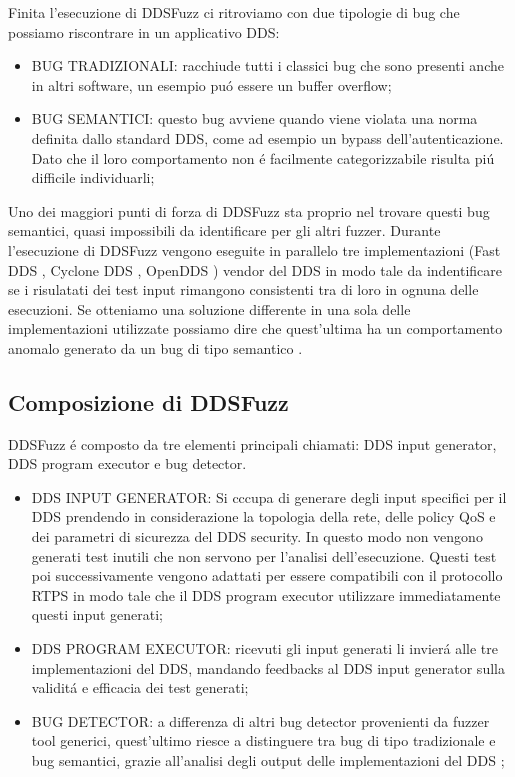 Finita l'esecuzione di DDSFuzz ci ritroviamo con due tipologie
di bug che possiamo riscontrare in un applicativo DDS:
\begin{itemize}
    \item BUG TRADIZIONALI: racchiude tutti i classici bug 
    che sono presenti anche in altri software, un esempio puó 
    essere un buffer overflow;
    \item BUG SEMANTICI: questo bug avviene quando viene violata
    una norma definita dallo standard DDS, come 
    ad esempio un bypass dell'autenticazione. 
    Dato che il loro comportamento
    non é facilmente categorizzabile risulta piú difficile individuarli;
\end{itemize}
Uno dei maggiori punti di forza di DDSFuzz sta proprio nel trovare
questi bug semantici, quasi impossibili da identificare per gli altri 
fuzzer. Durante l'esecuzione di DDSFuzz vengono eseguite in parallelo 
tre implementazioni (Fast DDS \cite{FastDDS}, Cyclone DDS \cite{CycloneDDS}, 
OpenDDS \cite{OpenDDS1}) vendor 
del DDS in modo tale da indentificare
se i risulatati dei test input rimangono consistenti tra di loro in 
ognuna delle esecuzioni. 
Se otteniamo una soluzione differente in una sola 
delle implementazioni utilizzate possiamo dire che quest'ultima ha un 
comportamento anomalo generato da un bug di tipo semantico 
\cite{10.1145/3691620.3695073}. 

\subsection{Composizione di DDSFuzz}
DDSFuzz é composto da tre elementi principali chiamati: 
DDS input generator, DDS program executor e bug detector.
\begin{itemize}
    \item DDS INPUT GENERATOR: Si cccupa di generare degli input 
    specifici per il DDS prendendo in considerazione la topologia
    della rete, delle policy QoS e dei parametri di sicurezza del 
    DDS security. In questo modo non vengono generati test inutili 
    che non servono per l'analisi dell'esecuzione. 
    Questi test poi successivamente vengono adattati per essere 
    compatibili con il 
    protocollo RTPS in modo tale che il DDS program executor utilizzare 
    immediatamente questi input generati;
    \item DDS PROGRAM EXECUTOR: ricevuti gli input generati 
    li invierá alle
    tre implementazioni del DDS, mandando feedbacks al DDS input generator
    sulla validitá e efficacia dei test generati;
    \item BUG DETECTOR: a differenza di altri bug detector provenienti da 
    fuzzer tool generici, quest'ultimo riesce a distinguere tra bug 
    di tipo tradizionale e bug semantici, grazie all'analisi
    degli output delle implementazioni del DDS
    \cite{10.1145/3691620.3695073};
\end{itemize}

